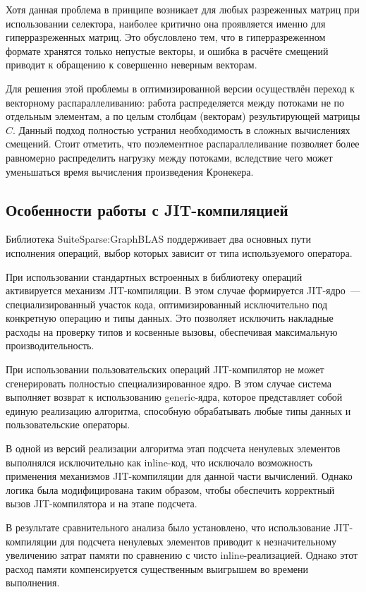 \documentclass[a4paper]{article}
\begin{document}
Хотя данная проблема в принципе возникает для любых разреженных матриц при использовании селектора, наиболее критично она проявляется именно для гиперразреженных матриц. Это обусловлено тем, что в гиперразреженном формате хранятся только непустые векторы, и ошибка в расчёте смещений приводит к обращению к совершенно неверным векторам.

Для решения этой проблемы в оптимизированной версии осуществлён переход к векторному распараллеливанию: работа распределяется между потоками не по отдельным элементам, а по целым столбцам (векторам) результирующей матрицы $C$. Данный подход полностью устранил необходимость в сложных вычислениях смещений. Стоит отметить, что поэлементное распараллеливание позволяет более равномерно распределить нагрузку между потоками, вследствие чего может уменьшаться время вычисления произведения Кронекера.

\subsection{Особенности работы с JIT-компиляцией}

Библиотека SuiteSparse:GraphBLAS поддерживает два основных пути исполнения операций, выбор которых зависит от типа используемого оператора.

При использовании стандартных встроенных в библиотеку операций активируется механизм JIT-компиляции. В этом случае формируется JIT-ядро~--- специализированный участок кода, оптимизированный исключительно под конкретную операцию и типы данных. Это позволяет исключить накладные расходы на проверку типов и косвенные вызовы, обеспечивая максимальную производительность.

При использовании пользовательских операций JIT-компилятор не может сгенерировать полностью специализированное ядро. В этом случае система выполняет возврат к использованию generic-ядра, которое представляет собой единую реализацию алгоритма, способную обрабатывать любые типы данных и пользовательские операторы.

В одной из версий реализации алгоритма этап подсчета ненулевых элементов выполнялся исключительно как inline-код, что исключало возможность применения механизмов JIT-компиляции для данной части вычислений. Однако логика была модифицирована таким образом, чтобы обеспечить корректный вызов JIT-компилятора и на этапе подсчета.

В результате сравнительного анализа было установлено, что использование JIT-компиляции для подсчета ненулевых элементов приводит к незначительному увеличению затрат памяти по сравнению с чисто inline-реализацией. Однако этот расход памяти компенсируется существенным выигрышем во времени выполнения.
\end{document}
